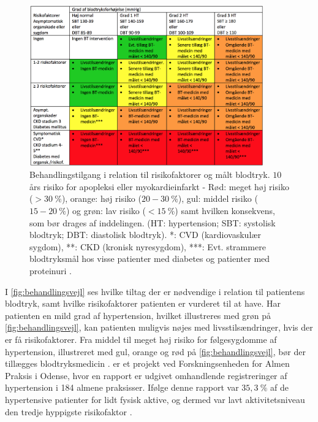 \begin{figure}[H]
\centering
\includegraphics[width=0.9\textwidth]{figures/behandlingsvejl}
\caption{Behandlingstilgang i relation til risikofaktorer og målt blodtryk. $10$ års risiko for apopleksi eller myokardieinfarkt - Rød: meget høj risiko ($>30~\%$), orange: høj risiko ($20-30~\%$), gul: middel risiko ($15-20~\%$) og grøn: lav risiko ($<15~\%$) samt hvilken konsekvens, som bør drages af inddelingen. (HT: hypertension; SBT: systolisk blodtryk; DBT: diastolisk blodtryk). *: CVD (kardiovaskulær sygdom), **: CKD (kronisk nyresygdom), ***: Evt. strammere blodtryksmål hos visse patienter med diabetes og patienter med proteinuri \citep{bech2015}.}
\label{fig:behandlingsvejl}
\end{figure}

\noindent
I \autoref{fig:behandlingsvejl} ses hvilke tiltag der er nødvendige i relation til patientens blodtryk, samt hvilke risikofaktorer patienten er vurderet til at have. Har patienten en mild grad af hypertension, hvilket illustreres med grøn på \autoref{fig:behandlingsvejl}, kan patienten muligvis nøjes med livsstilsændringer, hvis der er få risikofaktorer. Fra middel til meget høj risiko for følgesygdomme af hypertension, illustreret med gul, orange og rød på \autoref{fig:behandlingsvejl}, bør der tillægges blodtryksmedicin \citep{bech2015}.
 er et projekt ved Forskningsenheden for Almen Praksis i Odense, hvor en rapport er udgivet omhandlende registreringer af hypertension i 184 almene praksisser. Ifølge denne rapport var $35,3~\%$ af de hypertensive patienter for lidt fysisk aktive, og dermed var lavt aktivitetsniveau den tredje hyppigste risikofaktor \citep{munck2007}.

